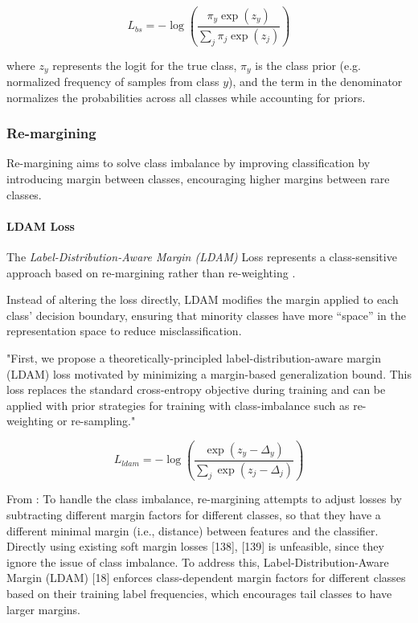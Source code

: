 \begin{equation}
    L_{bs} = - \log\left( \frac{\pi_y \exp(z_y)}{\sum_j \pi_j \exp(z_j)} \right)
\end{equation}

where $z_y$ represents the logit for the true class, $\pi_y$ is the class prior (e.g. normalized frequency of samples from class $y$), and the term in the denominator normalizes the probabilities across all classes while accounting for priors.


\subsubsection{Re-margining}
Re-margining aims to solve class imbalance by improving classification by introducing margin between classes, encouraging higher margins between rare classes.


\paragraph{LDAM Loss}
The \emph{Label-Distribution-Aware Margin (LDAM)} Loss represents a class-sensitive approach based on re-margining rather than re-weighting \cite{cao2019learningimbalanceddatasetslabeldistributionaware}. 

Instead of altering the loss directly, LDAM modifies the margin applied to each class’ decision boundary, ensuring that minority classes have more “space” in the representation space to reduce misclassification.

"First, we propose a theoretically-principled label-distribution-aware margin (LDAM) loss motivated by minimizing a margin-based generalization bound. This loss replaces the standard cross-entropy objective during training and can be applied with prior strategies for training with class-imbalance such as re-weighting or re-sampling." 

\begin{equation}
    L_{ldam} = - \log\left( \frac{\exp(z_y - \Delta_y)}{\sum_j \exp(z_j - \Delta_j)} \right)
\end{equation}

From \cite{zhang2023deep}: To handle the class imbalance, re-margining
attempts to adjust losses by subtracting different margin factors for
different classes, so that they have a different minimal margin (i.e.,
distance) between features and the classifier. Directly using existing
soft margin losses [138], [139] is unfeasible, since they ignore the
issue of class imbalance. To address this, Label-Distribution-Aware
Margin (LDAM) [18] enforces class-dependent margin factors for
different classes based on their training label frequencies, which
encourages tail classes to have larger margins.

